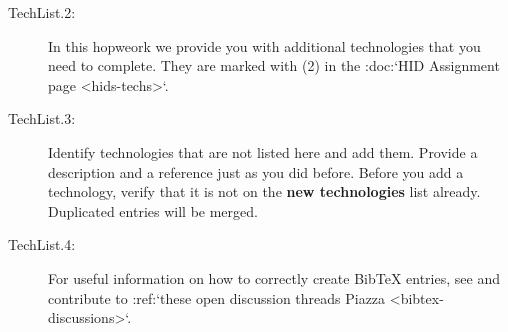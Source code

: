 \begin{description}
\item[TechList.2:]
  In this hopweork we provide you with additional technologies that
  you need to complete. They are marked with (2) in the :doc:`HID
  Assignment page <hids-techs>`.

\item[TechList.3:]
  Identify technologies that are not listed here and add   them.
  Provide a description and a reference just as you did before. Before you
  add a technology, verify that it is not on the {\bf new technologies} list
  already.  Duplicated entries will be merged.

\item[TechList.4:]
  For useful information on how to correctly create BibTeX entries,
  see and contribute to :ref:`these open discussion threads Piazza
  <bibtex-discussions>`. 

\end{description}
